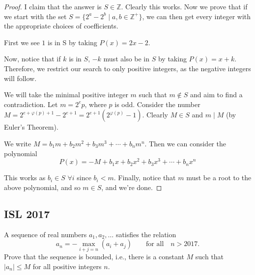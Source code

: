 \documentclass{article}
\theoremstyle{mytheoremstyle}
\theoremstyle{mytheoremstyle}
\theoremstyle{myproblemstyle}
\begin{document}
    \begin{proof}
        I claim that the answer is $S \in \mathbb{Z}$. Clearly this works. Now we prove that if we start with the set $S = \{2^a - 2^b \mid a, b \in \mathbb{Z}^+\}$, we can then get every integer with the appropriate choices of coefficients. 
        
        First we see $1$ is in S by taking $P(x) = 2x - 2$.

        Now, notice that if $k$ is in $S$, $-k$ must also be in $S$ by taking $P(x) = x + k$. Therefore, we restrict our search to only positive integers, as the negative integers will follow.

        We will take the minimal positive integer $m$ such that $m \notin S$ and aim to find a contradiction. Let $m = 2^ep$, where $p$ is odd. Consider the number $M = 2^{e + \varphi(p) + 1} - 2^{e+1} = 2^{e+1}(2^{\varphi(p)} - 1)$. Clearly $M \in S$ and $m \mid M$ (by Euler's Theorem).
        
        We write $M = b_1m + b_2m^2 + b_3m^3 + \cdots + b_nm^n$. Then we can consider the polynomial \[P(x) = -M + b_1x + b_2x^2 + b_3x^3 + \cdots + b_nx^n\]

        This works as $b_i \in S$ $\forall i$ since $b_i < m$. Finally, notice that $m$ must be a root to the above polynomial, and so $m \in S$, and we're done.
    \end{proof}

    \pagebreak

    \subsection{ISL 2017}
    \begin{problem}[2017 A4]
        A sequence of real numbers $a_1,a_2,\ldots$ satisfies the relation
\[ a_n=-\max_{i+j=n}(a_i+a_j)\qquad\text{for all}\quad n>2017. \]
Prove that the sequence is bounded, i.e., there is a constant $M$ such that $|a_n|\leq M$ for all positive integers $n$.
    \end{problem}
\end{document}
